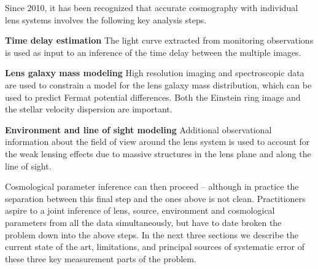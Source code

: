 Since 2010, it has been recognized that accurate cosmography with
individual lens systems involves the following key analysis steps.

\begin{description}
    \item{\bf Time delay estimation} The light curve extracted from
    monitoring observations is used as input to an inference of the
    time delay between the multiple images.
    \item{\bf Lens galaxy mass modeling} High resolution imaging
    and spectroscopic data are used to
    constrain a model for the lens galaxy mass distribution, which can be used
    to predict Fermat potential differences. Both the Einstein ring
    image and the stellar velocity dispersion are important.
    \item{\bf Environment and line of sight modeling} Additional observational
    information about the field of view around the lens system is used
    to account for the weak lensing effects due to massive structures in
    the lens plane and along the line of sight.
\end{description}

Cosmological parameter inference can then proceed -- although in
practice the  separation between this final step and the ones above is
not clean. Practitioners aspire to a joint inference of lens, source,
environment and cosmological parameters from all the data
simultaneously, but have to date broken the problem down  into the above
steps. In the next three sections we describe the current state of the art,
limitations, and principal sources of systematic error of these three
key measurement parts of the problem.
